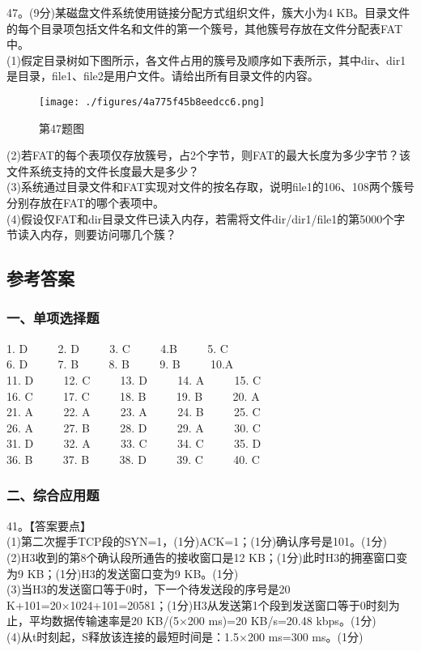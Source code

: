 47。(9分)某磁盘文件系统使用链接分配方式组织文件，簇大小为4 KB。目录文件的每个目录项包括文件名和文件的第一个簇号，其他簇号存放在文件分配表FAT中。 \\
(1)假定目录树如下图所示，各文件占用的簇号及顺序如下表所示，其中dir、dir1是目录，file1、file2是用户文件。请给出所有目录文件的内容。 \\
\begin{figure}[ht]
\centering
\texttt{[image: ./figures/4a775f45b8eedcc6.png]}
\caption{第47题图} \label{fig_CSN16_6}
\end{figure}
(2)若FAT的每个表项仅存放簇号，占2个字节，则FAT的最大长度为多少字节？该文件系统支持的文件长度最大是多少？ \\
(3)系统通过目录文件和FAT实现对文件的按名存取，说明file1的106、108两个簇号分别存放在FAT的哪个表项中。 \\
(4)假设仅FAT和dir目录文件已读入内存，若需将文件dir/dir1/file1的第5000个字节读入内存，则要访问哪几个簇？

\subsection{参考答案}
\subsubsection{一、单项选择题}
1. D  $\qquad$ 2. D $\qquad$ 3. C $\qquad$ 4.B $\qquad$ 5. C \\
6. D $\qquad$ 7. B $\qquad$ 8. B $\qquad$ 9. B $\qquad$ 10.A \\
11. D $\qquad$ 12. C $\qquad$ 13. D $\qquad$ 14. A $\qquad$ 15. C \\
16. C $\qquad$ 17. C $\qquad$ 18. B $\qquad$ 19. B $\qquad$ 20. A \\
21. A $\qquad$ 22. A $\qquad$ 23. A $\qquad$ 24. B $\qquad$ 25. C \\
26. A $\qquad$ 27. B $\qquad$ 28. D $\qquad$ 29. A $\qquad$ 30. C \\
31. D $\qquad$ 32. A $\qquad$ 33. C $\qquad$ 34. C $\qquad$ 35. D \\
36. B $\qquad$ 37. B $\qquad$ 38. D $\qquad$ 39. C $\qquad$ 40. C

\subsubsection{二、综合应用题}
41。【答案要点】 \\
(1)第二次握手TCP段的SYN=1，(1分)ACK=1；(1分)确认序号是101。(1分) \\
(2)H3收到的第8个确认段所通告的接收窗口是12 KB；(1分)此时H3的拥塞窗口变为9 KB；(1分)H3的发送窗口变为9 KB。(1分) \\
(3)当H3的发送窗口等于0时，下一个待发送段的序号是20 K+101=20×1024+101=20581；(1分)H3从发送第1个段到发送窗口等于0时刻为止，平均数据传输速率是20 KB/(5×200 ms)=20 KB/s=20.48 kbps。(1分) \\
(4)从t时刻起，S释放该连接的最短时间是：1.5×200 ms=300 ms。(1分)


